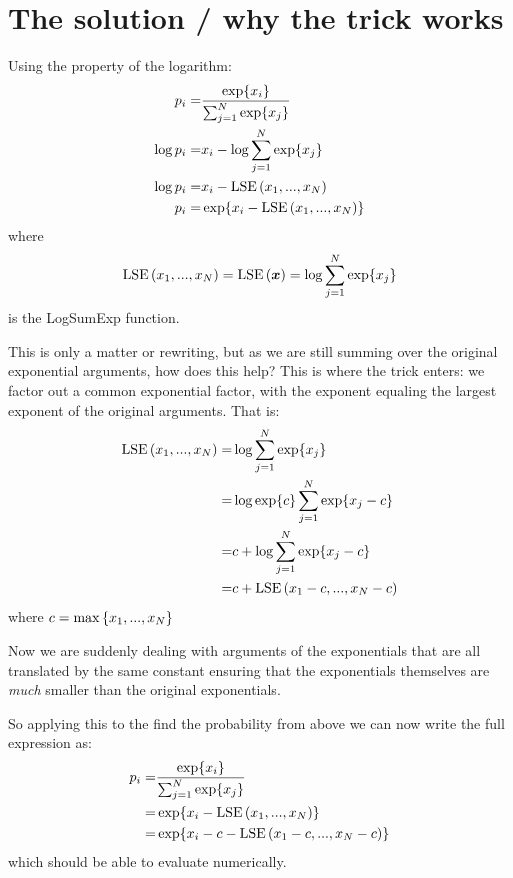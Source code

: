 \documentclass{article}
\DeclareMathOperator{\LSE}{LSE}
\begin{document}
\section{The solution / why the trick works}
Using the property of the logarithm:
\begin{align*}
	p_{i} =& \frac{\exp{x_{i}}}{\sum_{j=1}^{N} \exp{x_{j}}} \\
	\log{p_{i}} =& x_{i} - \log{\sum_{j=1}^{N} \exp{x_{j}}} \\
	\log{p_{i}} =& x_{i} - \LSE \qty(x_{1}, ..., x_{N}) \\
	p_{i} =& \exp{ x_{i} - \LSE \qty(x_{1}, ..., x_{N}) }
\end{align*}
where 
\begin{align*}
	\LSE \qty(x_{1}, ..., x_{N}) = \LSE \qty(\vb*{x}) = \log{\sum_{j=1}^{N} \exp{x_{j}}}
\end{align*}
is the LogSumExp function. 

This is only a matter or rewriting, but as we are still summing over the original exponential arguments, how does this help?
This is where the trick enters: we factor out a common exponential factor, with the exponent equaling the largest exponent of the original arguments. 
That is:
\begin{align*}
	\LSE \qty(x_{1}, ..., x_{N}) =& \log{\sum_{j=1}^{N} \exp{x_{j}}} \\
	=& \log{\exp{c} \sum_{j=1}^{N} \exp{x_{j} - c}} \\
	=& c + \log{\sum_{j=1}^{N} \exp{x_{j} - c}} \\
	=& c + \LSE \qty( x_{1} - c, ..., x_{N} - c) \\
\end{align*}
where $c = \max \qty{x_{1}, ... , x_{N}}$

Now we are suddenly dealing with arguments of the exponentials that are all translated by the same constant ensuring that the exponentials themselves are \emph{much} smaller than the original exponentials. 

So applying this to the find the probability from above we can now write the full expression as:
\begin{align*}
	p_{i} =& \frac{\exp{x_{i}}}{\sum_{j=1}^{N} \exp{x_{j}}} \\
	=& \exp{ x_{i} - \LSE \qty(x_{1}, ..., x_{N}) } \\
	=& \exp{ x_{i} - c - \LSE \qty(x_{1}-c, ..., x_{N}-c) }
\end{align*}
which should be able to evaluate numerically. 
\end{document}
